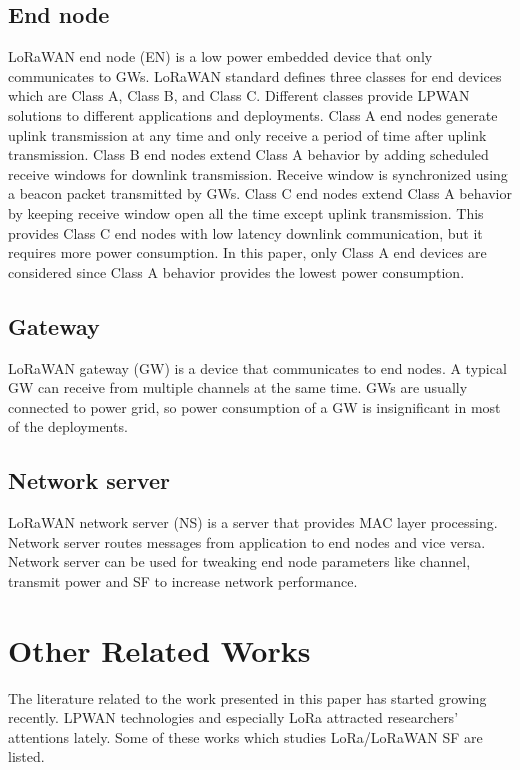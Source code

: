 \documentclass[conference]{IEEEtran}
\begin{document}
\subsection{End node}
\par LoRaWAN end node (EN) is a low power embedded device that only communicates to GWs. LoRaWAN standard defines three classes for end devices which are Class A, Class B, and Class C. Different classes provide LPWAN solutions to different applications and deployments. Class A end nodes generate uplink transmission at any time and only receive a period of time after uplink transmission. Class B end nodes extend Class A behavior by adding scheduled receive windows for downlink transmission. Receive window is synchronized using a beacon packet transmitted by GWs. Class C end nodes extend Class A behavior by keeping receive window open all the time except uplink transmission. This provides Class C end nodes with low latency downlink communication, but it requires more power consumption. In this paper, only Class A end devices are considered since Class A behavior provides the lowest power consumption.

\subsection{Gateway}
\par LoRaWAN gateway (GW) is a device that communicates to end nodes. A typical GW can receive from multiple channels at the same time. GWs are usually connected to power grid, so power consumption of a GW is insignificant in most of the deployments.

\subsection{Network server}
\par LoRaWAN network server (NS) is a server that provides MAC layer processing. Network server routes messages from application to end nodes and vice versa. Network server can be used for tweaking end node parameters like channel, transmit power and SF to increase network performance.


\section{Other Related Works} \label{Other Related Works}
\par The literature related to the work presented in this paper has started growing recently. LPWAN technologies and especially LoRa attracted researchers’ attentions lately. Some of these works which studies LoRa/LoRaWAN SF are listed.
\end{document}

